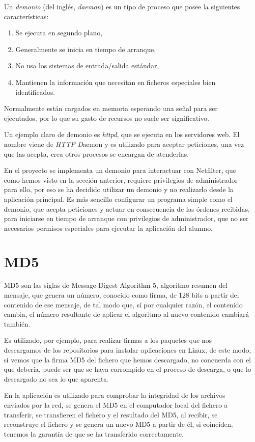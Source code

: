 Un \emph{demonio} (del inglés, \emph{daemon}\cite{SO:2006}) es un tipo de proceso que posee la siguientes características:

\begin{enumerate}
	\item Se ejecuta en segundo plano,
	\item Generalmente se inicia en tiempo de arranque,
	\item No usa los sistemas de entrada/salida est\'andar,
	\item Mantienen la información que necesitan en ficheros especiales bien identificados.
\end{enumerate}

Normalmente est\'an cargados en memoria esperando una señal para ser ejecutados, por lo que su gasto de recursos no suele ser significativo.
\newline


Un ejemplo claro de demonio es \emph{httpd}, que se ejecuta en los servidores web. El nombre viene de \emph{HTTP D}aemon y es utilizado para aceptar peticiones, una vez que las acepta, crea otros procesos se encargan de atenderlas.
\newline

En el proyecto se implementa un demonio para interactuar con Netfilter, que como hemos visto en la sección anterior, requiere privilegios de administrador para ello, por eso se ha decidido utilizar un demonio y no realizarlo desde la aplicación principal. Es más sencillo configurar un programa simple como el demonio, que acepta peticiones y actuar en consecuencia de las órdenes recibidas, para iniciarse en tiempo de arranque con privilegios de administrador, que no ser necesarios permisos especiales para ejecutar la aplicación del alumno.


\section{MD5}

MD5\cite{MD5:2007} son las siglas de Message-Digest Algorithm 5, algoritmo resumen del mensaje, que genera un número, conocido como firma, de 128 bits a partir del contenido de ese mensaje, de tal modo que, sí por cualquier razón, el contenido cambia, el número resultante de aplicar el algoritmo al nuevo contenido cambiará también.
\newline

Es utilizado, por ejemplo, para realizar firmas a los paquetes que nos descargamos de los repositorios para instalar aplicaciones en Linux, de este modo, si vemos que la firma MD5 del fichero que hemos descargado, no concuerda con el que debería, puede ser que se haya corrompido en el proceso de descarga, o que lo descargado no sea lo que aparenta.
\newline

En la aplicación es utilizado para comprobar la integridad de los archivos enviados por la red, se genera el MD5 en el computador local del fichero a transferir, se transfieren el fichero y el resultado del MD5, al recibir, se reconstruye el fichero y se genera un nuevo MD5 a partir de él, si coinciden, tenemos la garantía de que se ha transferido correctamente.

